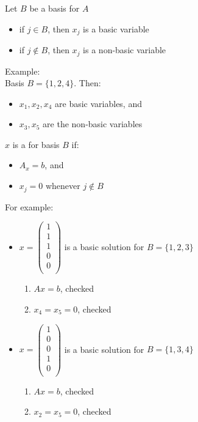 \documentclass[letterpaper, 12pt]{article}
\newcommand{\red}[1]{{\color{red}{#1}}}
\begin{document}
    Let $B$ be a basis for $A$\\
    \begin{itemize}
        \item if $j \in B$, then $x_j$ is a basic variable
        \item if $j \notin B$, then $x_j$ is a non-basic variable
    \end{itemize}
    Example:\\
    Basis $B = \{1, 2, 4\}$. Then:
    \begin{itemize}
        \item $x_1, x_2, x_4$ are basic variables, and
        \item $x_3, x_5$ are the non-basic variables
    \end{itemize}
    \bigskip
    $x$ is a \red{basic solution} for basis $B$ if:
    \begin{itemize}
        \item $A_x = b$, and
        \item $x_j = 0$ whenever $j \notin B$
    \end{itemize}
    For example:\\
    \begin{itemize}
        \item $x = \begin{pmatrix}
            1\\
            1\\
            1\\
            0\\
            0\\
        \end{pmatrix}$ is a basic solution for $B = \{1, 2, 3\}$
        \begin{enumerate}
            \item $Ax = b$, checked
            \item $x_4 = x_5 = 0$, checked
        \end{enumerate}
        \item $x = \begin{pmatrix}
            1\\
            0\\
            0\\
            1\\
            0\\
        \end{pmatrix}$ is a basic solution for $B = \{1, 3, 4\}$
        \begin{enumerate}
            \item $Ax = b$, checked
            \item $x_2 = x_5 = 0$, checked
        \end{enumerate}
    \end{itemize}
\end{document}
